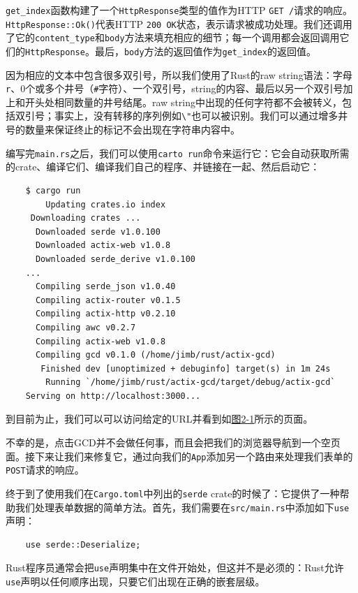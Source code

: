 \texttt{get\_index}函数构建了一个\texttt{HttpResponse}类型的值作为HTTP \texttt{GET /}请求的响应。\texttt{HttpResponse::Ok()}代表HTTP \texttt{200 OK}状态，表示请求被成功处理。我们还调用了它的\texttt{content\_type}和\texttt{body}方法来填充相应的细节；每一个调用都会返回调用它们的\texttt{HttpResponse}。最后，\texttt{body}方法的返回值作为\texttt{get\_index}的返回值。

因为相应的文本中包含很多双引号，所以我们使用了Rust的raw string语法：字母\texttt{r}、0个或多个井号（\texttt{\#}字符）、一个双引号，string的内容、最后以另一个双引号加上和开头处相同数量的井号结尾。raw string中出现的任何字符都不会被转义，包括双引号；事实上，没有转移的序列例如\texttt{\textbackslash"}也可以被识别。我们可以通过增多井号的数量来保证终止的标记不会出现在字符串内容中。

编写完\texttt{main.rs}之后，我们可以使用\texttt{carto run}命令来运行它：它会自动获取所需的crate、编译它们、编译我们自己的程序、并链接在一起、然后启动它：
\begin{verbatim}
    $ cargo run
        Updating crates.io index
     Downloading crates ...
      Downloaded serde v1.0.100
      Downloaded actix-web v1.0.8
      Downloaded serde_derive v1.0.100
    ...
      Compiling serde_json v1.0.40
      Compiling actix-router v0.1.5
      Compiling actix-http v0.2.10
      Compiling awc v0.2.7
      Compiling actix-web v1.0.8
      Compiling gcd v0.1.0 (/home/jimb/rust/actix-gcd)
       Finished dev [unoptimized + debuginfo] target(s) in 1m 24s
        Running `/home/jimb/rust/actix-gcd/target/debug/actix-gcd`
    Serving on http://localhost:3000...
\end{verbatim}

到目前为止，我们可以可以访问给定的URL并看到如\hyperref[f2-1]{图2-1}所示的页面。

不幸的是，点击GCD并不会做任何事，而且会把我们的浏览器导航到一个空页面。接下来让我们来修复它，通过向我们的\texttt{App}添加另一个路由来处理我们表单的\texttt{POST}请求的响应。

终于到了使用我们在\texttt{Cargo.toml}中列出的\texttt{serde} crate的时候了：它提供了一种帮助我们处理表单数据的简单方法。首先，我们需要在\texttt{src/main.rs}中添加如下\texttt{use}声明：
\begin{verbatim}
    use serde::Deserialize;
\end{verbatim}

Rust程序员通常会把\texttt{use}声明集中在文件开始处，但这并不是必须的：Rust允许\texttt{use}声明以任何顺序出现，只要它们出现在正确的嵌套层级。

